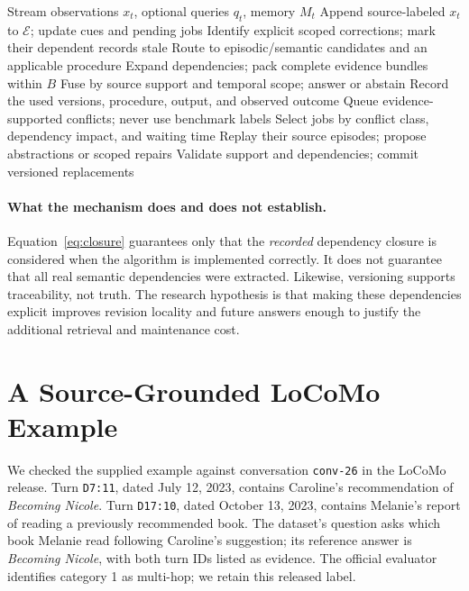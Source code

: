 \documentclass{article}
\newcommand{\E}{\mathcal{E}}
\begin{document}
\begin{algorithm}[t]
\caption{Multi-timescale operation with evidence-bound reconsolidation}
\label{alg:mtm}
\begin{algorithmic}[1]
\Require Stream observations $x_t$, optional queries $q_t$, memory $M_t$
\State Append source-labeled $x_t$ to $\E$; update cues and pending jobs
\State Identify explicit scoped corrections; mark their dependent records stale
  \State Route to episodic/semantic candidates and an applicable procedure
  \State Expand dependencies; pack complete evidence bundles within $B$
  \State Fuse by source support and temporal scope; answer or abstain
  \State Record the used versions, procedure, output, and observed outcome
  \State Queue evidence-supported conflicts; never use benchmark labels
\EndIf
{}
  \State Select jobs by conflict class, dependency impact, and waiting time
  \State Replay their source episodes; propose abstractions or scoped repairs
  \State Validate support and dependencies; commit versioned replacements
\EndIf
\end{algorithmic}
\end{algorithm}

\paragraph{What the mechanism does and does not establish.}
Equation~\ref{eq:closure} guarantees only that the \emph{recorded} dependency
closure is considered when the algorithm is implemented correctly. It does
not guarantee that all real semantic dependencies were extracted. Likewise,
versioning supports traceability, not truth. The research hypothesis is that
making these dependencies explicit improves revision locality and future
answers enough to justify the additional retrieval and maintenance cost.

\FloatBarrier
\section{A Source-Grounded LoCoMo Example}
\label{sec:example}
We checked the supplied example against conversation \texttt{conv-26} in the
LoCoMo release. Turn \texttt{D7:11}, dated July 12, 2023, contains Caroline's
recommendation of \emph{Becoming Nicole}. Turn \texttt{D17:10}, dated October
13, 2023, contains Melanie's report of reading a previously recommended book.
The dataset's question asks which book Melanie read following Caroline's
suggestion; its reference answer is \emph{Becoming Nicole}, with both turn
IDs listed as evidence. The official evaluator identifies category 1 as
multi-hop; we retain this released label.
\end{document}
